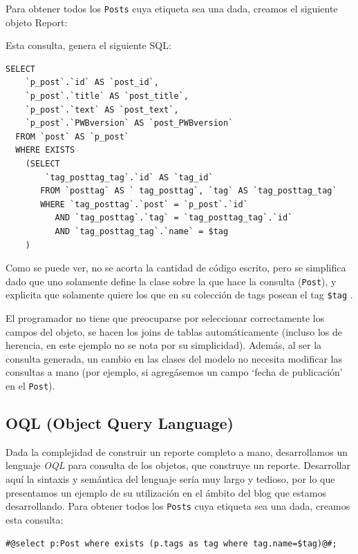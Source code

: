 Para obtener todos los \verb"Posts" cuya etiqueta sea una dada, creamos el siguiente objeto Report:

\begin{lgrind}

\end{lgrind}

Esta consulta, genera el siguiente SQL:

\begin{verbatim}
SELECT
    `p_post`.`id` AS `post_id`,
    `p_post`.`title` AS `post_title`,
    `p_post`.`text` AS `post_text`,
    `p_post`.`PWBversion` AS `post_PWBversion`
  FROM `post` AS `p_post`
  WHERE EXISTS
    (SELECT
        `tag_posttag_tag`.`id` AS `tag_id`
       FROM `posttag` AS ` tag_posttag`, `tag` AS `tag_posttag_tag`
       WHERE `tag_posttag`.`post` = `p_post`.`id`
          AND `tag_posttag`.`tag` = `tag_posttag_tag`.`id`
          AND `tag_posttag_tag`.`name` = $tag
    )
\end{verbatim}


Como se puede ver, no se acorta la cantidad de código escrito, pero se simplifica dado que uno solamente define la clase sobre la que hace la consulta (\verb"Post"), y explicita que solamente quiere los que en su colección de tags posean el tag \verb'$tag' %
.

El programador no tiene que preocuparse por seleccionar correctamente los campos del objeto, se hacen los joins de tablas automáticamente (incluso los de herencia, en este ejemplo no se nota por su simplicidad). Además, al ser la consulta generada, un cambio en las clases del modelo no necesita modificar las consultas a mano (por ejemplo, si agregásemos un campo `fecha de publicación' en el \verb"Post").

\subsection{OQL (Object Query Language)}
\label{sub-oql}
Dada la complejidad de construir un reporte completo a mano, desarrollamos un lenguaje \emph{OQL} para consulta de los objetos, que construye un reporte. Desarrollar aquí la sintaxis y semántica del lenguaje sería muy largo y tedioso, por lo que presentamos un ejemplo de su utilización en el ámbito del blog que estamos desarrollando. Para obtener todos los \verb"Posts" cuya etiqueta sea una dada, creamos esta consulta:

\begin{verbatim}
#@select p:Post where exists (p.tags as tag where tag.name=$tag)@#;
\end{verbatim}

